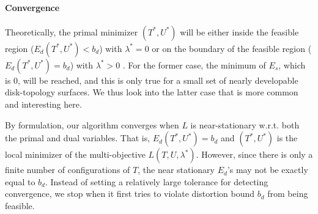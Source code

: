 

\paragraph{Convergence}
Theoretically, the primal minimizer $(T^*, U^*)$ will be either inside the feasible region ($E_d(T^*, U^*) < b_d$) with $\lambda^* = 0$ or on the boundary of the feasible region ($E_d(T^*, U^*) = b_d$) with $\lambda^* > 0$ \cite{a computational optimization book}. For the former case, the minimum of $E_s$, which is $0$, will be reached, and this is only true for a small set of nearly developable disk-topology surfaces. We thus look into the latter case that is more common and interesting here.

By formulation, our algorithm converges when $L$ is near-stationary w.r.t. both the primal and dual variables. That is, $E_d(T^*, U^*) = b_d$ and $(T^*, U^*)$ is the local minimizer of the multi-objective $L(T,U,\lambda^*)$. However, since there is only a finite number of configurations of $T$, the near stationary $E_d$'s may not be exactly equal to $b_d$. Instead of setting a relatively large tolerance for detecting convergence, we stop when it first tries to violate distortion bound $b_d$ from being feasible.
